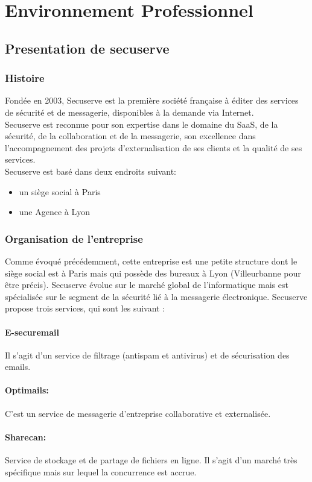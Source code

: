 \section{Environnement Professionnel }
\subsection{Presentation de secuserve}
\subsubsection{Histoire}
Fondée en 2003, Secuserve est la première société française à éditer des services de sécurité et de messagerie, disponibles à la demande via Internet.\\
Secuserve est reconnue pour son expertise dans le domaine du SaaS, de la sécurité, de la collaboration et de la messagerie, son excellence dans l’accompagnement des projets d’externalisation de ses clients et la qualité de ses services.\\
Secuserve est basé dans deux endroits suivant: 
\begin{itemize}
\item un siège social à Paris 
\item une Agence à Lyon
\end{itemize}

\subsubsection{Organisation de l'entreprise}
Comme évoqué précédemment, cette entreprise est une petite structure dont le siège social est à Paris mais qui possède des bureaux à Lyon (Villeurbanne pour être précis). 
Secuserve évolue sur le marché global de l’informatique mais est spécialisée sur le segment de la sécurité lié à la messagerie électronique.
Secuserve propose trois services, qui sont les suivant :
\paragraph{E-securemail}
Il s’agit d’un service de filtrage (antispam et antivirus) et de sécurisation des emails.
\paragraph{Optimails:} C’est un service de messagerie d’entreprise collaborative et externalisée.
\paragraph{Sharecan:}Service de stockage et de partage de fichiers en ligne.
Il s’agit d’un marché très spécifique mais sur lequel la concurrence est accrue.

